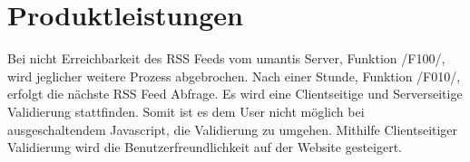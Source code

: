 \section{Produktleistungen}

    Bei nicht Erreichbarkeit des RSS Feeds vom umantis Server, Funktion /F100/, wird jeglicher weitere Prozess abgebrochen.
    Nach einer Stunde, Funktion /F010/, erfolgt die nächste RSS Feed Abfrage.
    Es wird eine \gls{Clientseitige} und \gls{Serverseitige} Validierung stattfinden. Somit ist es dem User nicht möglich bei ausgeschaltendem Javascript, die Validierung zu umgehen. Mithilfe Clientseitiger Validierung wird die Benutzerfreundlichkeit auf der Website gesteigert.